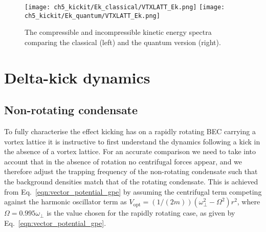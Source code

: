 \begin{figure}
    \centering
    \texttt{[image: ch5\_kickit/Ek\_classical/VTXLATT\_Ek.png]}
    \texttt{[image: ch5\_kickit/Ek\_quantum/VTXLATT\_Ek.png]}
\iffalse
    \texttt{[image: ch5\_kickit/Ek\_classical/VTXLATT\_Comp.png]}
    \texttt{[image: ch5\_kickit/Ek\_quantum/VTXLATT\_Comp.png]}

    \texttt{[image: ch5\_kickit/Ek\_classical/VTXLATT\_Incomp.png]}
    \texttt{[image: ch5\_kickit/Ek\_quantum/VTXLATT\_Incomp.png]}

    \caption[Kinetic energy spectra with and without quantum phase.]{The kinetic energy spectra (top row), compressible (middle row), and incompressible energies (bottom row), comparing the classical (left) and the quantum version (right). The inclusion of the phase term eliminates the peaks from the compressible energy, yet yields a more accurate representation of the magnitude of both energies (see text).}
\fi
\caption[Kinetic energy spectra with and without quantum phase.]{The compressible and incompressible kinetic energy spectra comparing the classical (left) and the quantum version (right).}
\label{fig:ek_clvqu}
\end{figure}


\section{Delta-kick dynamics}\label{sec:kickvl}
\subsection{Non-rotating condensate}
To fully characterise the effect kicking has on a rapidly rotating BEC carrying a vortex lattice it is instructive to first understand the dynamics following a kick in the absence of a vortex lattice. For an accurate comparison we need to take into account that in the absence of rotation no centrifugal forces appear, and we therefore adjust the trapping frequency of the non-rotating condensate such that the background densities match that of the rotating condensate. This is achieved from Eq.~\eqref{eqn:vector_potential_gpe} by assuming the centrifugal term competing against the harmonic oscillator term as $V_{\text{opt}} = (1/(2m))(\omega^2_\perp - \Omega^2)
{r}^2$, where $\Omega=0.995\omega_\perp$ is the value chosen for the rapidly rotating case, as given by Eq.~\eqref{eqn:vector_potential_gpe}.

